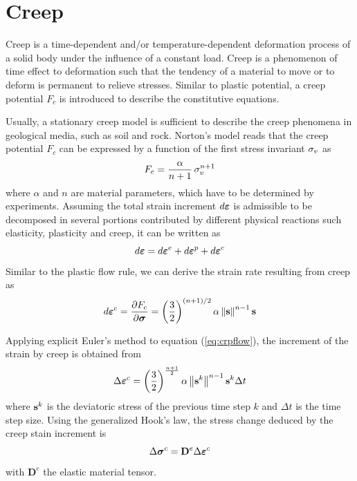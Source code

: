 \section{Creep}

Creep is a time-dependent and/or temperature-dependent deformation
process of a solid body under the influence of a constant load.
%
Creep is a phenomenon of time effect to deformation such that the
tendency of a material to move or to deform is permanent to relieve
stresses. Similar to plastic potential, a creep potential $F_c$ is
introduced to describe the constitutive equations.

Usually, a stationary creep model is sufficient to describe the
creep phenomena in geological media, such as soil and rock. Norton's
model reads that the creep potential $F_c$ can be expressed by a
function of the first stress invariant $\sigma_{v}$ as
%
\begin{equation}
F_c = \frac{\alpha}{n+1}\,\sigma_{v}^{n+1}
\end{equation}
%
where $\alpha$ and $n$ are material parameters, which have to be
determined by experiments.
%
Assuming the total strain increment $d \boldsymbol{\varepsilon}$ is admissible to be
decomposed in several portions contributed by different physical
reactions such elasticity, plasticity and creep, it can be written
as
%
\begin{equation}
d \boldsymbol{\varepsilon} = d \boldsymbol{\varepsilon}^{e}+d \boldsymbol{\varepsilon}^{p}+d \boldsymbol{\varepsilon}^{c}
\end{equation}
%
Similar to the plastic flow rule, we can derive the strain rate
resulting from creep as
%
\begin{equation}
d \boldsymbol{\varepsilon}^{c}
=
\frac{ \partial F_c}{\partial \bm \sigma}
=
\left(\frac{3}{2}\right)^{(n+1)/2}
\alpha\left\Vert {\mathbf{s}}
\right\Vert^{n-1}\mathbf{s}
\label{eq:crpflow}
\end{equation}

Applying explicit Euler's method to equation (\ref{eq:crpflow}), the
increment of the strain by creep is obtained from
%
\begin{equation}
\Delta \boldsymbol{\varepsilon}^{c}  =
\left(\frac{3}{2}\right)^{\frac{n+1}{2}}\alpha\left\lVert \mathbf{s}^k \right\rVert^{n-1}\mathbf{s}^k
\Delta t \label{eq:dstrain_crp}
\end{equation}
%
where $\mathbf{s}^k$ is the deviatoric stress of the previous time step
$k$ and $ \Delta t$ is the time step size.
%
Using the generalized Hook's law, the stress change deduced by the
creep stain increment is
%
\begin{equation}
\Delta \bm \sigma^{c}  =  \mathbf D^{e} \Delta \boldsymbol{\varepsilon}^{c}
\label{eq:dstress_crp}
\end{equation}
%
with $\mathbf D^{e}$ the elastic material tensor.


